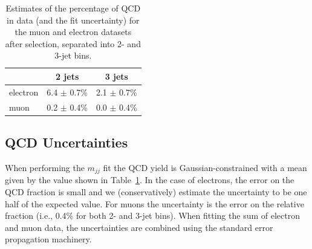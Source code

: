 


\begin{table}[bthp]
\begin{center}
  \begin{tabular}{l c c}
    \hline  \hline
     & 2 jets & 3 jets \\
    \hline  
    electron  & 6.4 $\pm$ 0.7\% & 2.1 $\pm$ 0.7\% \\
    muon      & 0.2 $\pm$ 0.4\% & 0.0 $\pm$ 0.4\% \\
    \hline  \hline
  \end{tabular}
\end{center}
\caption{\label{tab:qcdfrac} Estimates of the percentage of QCD in data (and
the fit uncertainty) for the muon and electron datasets after selection, 
separated into 2- and 3-jet bins.}
\end{table}

\subsection{QCD Uncertainties}
\label{sec:qcd_Uncertainty}

When performing the $m_{jj}$ fit  the QCD yield
is Gaussian-constrained with a mean given by the value shown in
Table~\ref{tab:qcdfrac}.
In the case of electrons, the error on the QCD fraction
is small and we (conservatively) estimate
the uncertainty to be one half of the expected value. For muons the
uncertainty is the error on the relative fraction (i.e.,
0.4\% for both 2- and 3-jet bins).
When fitting the sum of electron and muon data, the uncertainties
are combined using the standard error propagation machinery.


